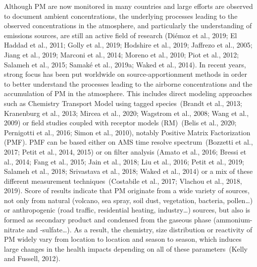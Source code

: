 \documentclass[
]{article}
\begin{document}
Although PM are now monitored in many countries and large efforts are
observed to document ambient concentrations, the underlying processes
leading to the observed concentrations in the atmosphere, and
particularly the understanding of emissions sources, are still an active
field of research (Diémoz et al., 2019; El Haddad et al., 2011; Golly et
al., 2019; Hodshire et al., 2019; Jaffrezo et al., 2005; Jiang et al.,
2019; Marconi et al., 2014; Moreno et al., 2010; Piot et al., 2012;
Salameh et al., 2015; Samaké et al., 2019a; Waked et al., 2014). In
recent years, strong focus has been put worldwide on
source-apportionment methods in order to better understand the processes
leading to the airborne concentrations and the accumulation of PM in the
atmosphere. This includes direct modeling approaches such as Chemistry
Transport Model using tagged species~(Brandt et al., 2013; Kranenburg et
al., 2013; Mircea et al., 2020; Wagstrom et al., 2008; Wang et al.,
2009) or field studies coupled with receptor models (RM)~(Belis et al.,
2020; Pernigotti et al., 2016; Simon et al., 2010), notably Positive
Matrix Factorization (PMF). PMF can be based either on AMS time resolve
spectrum~(Bozzetti et al., 2017; Petit et al., 2014, 2015) or on filter
analysis (Amato et al., 2016; Bressi et al., 2014; Fang et al., 2015;
Jain et al., 2018; Liu et al., 2016; Petit et al., 2019; Salameh et al.,
2018; Srivastava et al., 2018; Waked et al., 2014) or a mix of these
different measurement techniques~(Costabile et al., 2017; Vlachou et
al., 2018, 2019). Score of results indicate that PM originate from a
wide variety of sources, not only from natural (volcano, sea spray, soil
dust, vegetation, bacteria, pollen\ldots) or anthropogenic (road
traffic, residential heating, industry\ldots) sources, but also is
formed as secondary product and condensed from the gaseous phase
(ammonium-nitrate and -sulfate\ldots). As a result, the chemistry, size
distribution or reactivity of PM widely vary from location to location
and season to season, which induces large changes in the health impacts
depending on all of these parameters~(Kelly and Fussell, 2012).
\end{document}
